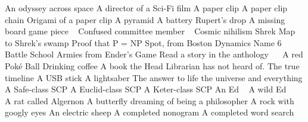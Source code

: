 \begin{multicols}{2}
\begin{small}
\begin{tabbing}
            {An odyssey across space}
          {A director of a Sci-Fi film}
           {A paper clip}
           {A paper clip chain}
           {Origami of a paper clip}
        {A pyramid}
        {A battery}
         {Rupert's drop}
           {A missing board game piece ~\E}
             {Confused committee member ~\E}
            {Cosmic nihilism}
        {Shrek}
        {Map to Shrek's swamp}
         {Proof that P = NP}
        {Spot, from Boston Dynamics}
         {Name 6 Battle School Armies from Ender's Game}
        {Read a story in the anthology ~\FD ~\E}
        {A red Poké Ball}
        {Drinking coffee}
        {A book the Head Librarian has not heard of.}
          {The true timeline}
          {A USB stick}
       {A lightsaber}
           {The answer to life the universe and everything \FD}
          {A Safe-class SCP}
          {A Euclid-class SCP}
          {A Keter-class SCP}
            {An Ed ~\E}
            {A wild Ed ~\E ~\FD}
            {A rat called Algernon}
          {A butterfly dreaming of being a philosopher}
          {A rock with googly eyes}
          {An electric sheep}
          {A completed nonogram}
          {A completed word search}
    \end{tabbing}
  \end{small}
\end{multicols}

